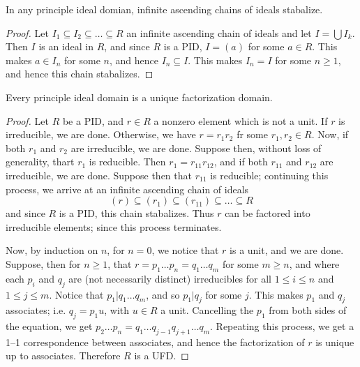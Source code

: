 \begin{lemma}\label{2.3.5}
    In any principle ideal domian, infinite ascending chains of ideals
    stabalize.
\end{lemma}
\begin{proof}
    Let $I_1 \subseteq I_2 \subseteq \dots \subseteq R$ an infinite ascending
    chain of ideals and let $I=\bigcup{I_k}$. Then $I$ is an ideal in  $R$, and
    since  $R$ is a PID,  $I=(a)$ for some $a \in R$. This makes  $a \in I_n$
    for some  $n$, and hence  $I_n \subseteq I$. This makes  $I_n=I$ for some
    $n \geq 1$, and hence this chain stabalizes.
\end{proof}

\begin{theorem}\label{2.3.6}
    Every principle ideal domain is a unique factorization domain.
\end{theorem}
\begin{proof}
    Let $R$ be a PID, and  $r \in R$ a nonzero element which is not a unit. If
    $r$ is irreducible, we are done. Otherwise, we have  $r=r_1r_2$ fr some
    $r_1,r_2 \in R$. Now, if both $r_1$ and $r_2$ are irreducible, we are done.
    Suppose then, without loss of generality, thart $r_1$ is reducible. Then
    $r_1=r_{11}r_{12}$, and if both $r_{11}$ and $r_{12}$ are irreducible, we
    are done. Suppose then that $r_{11}$ is reducible; continuing this process,
    we arrive at an infinite ascending chain of ideals
    \begin{equation*}
        (r) \subseteq (r_1) \subseteq (r_{11}) \subseteq \dots \subseteq R
    \end{equation*}
    and since $R$ is a PID, this chain stabalizes. Thus $r$ can be factored into
    irreducible elements; since this process terminates.

    Now, by induction on $n$, for  $n=0$, we notice that  $r$ is a unit, and we
    are done. Suppose, then for  $n \geq 1$, that  $r=p_1 \dots p_n=q_1 \dots
    q_m$ for some $m \geq n$, and where each  $p_i$ and  $q_j$ are  (not
    necessarily distinct) irreducibles for all $1 \leq i \leq n$ and $1 \leq j
    \leq m$. Notice that  $p_1|q_1 \dots q_m$, and so $p_1|q_j$ for some $j$.
    This makes  $p_1$ and $q_j$ associates; i.e.  $q_j=p_1u$, with $u \in R$ a
    unit. Cancelling the  $p_1$ from both sides of the equation, we get $p_2
    \dots p_n=q_1 \dots q_{j-1}q_{j+1} \dots q_m$. Repeating this process, we
    get a 1--1 correspondence between associates, and hence the factorization of
    $r$ is unique up to associates. Therefore  $R$ is a UFD.
\end{proof}
